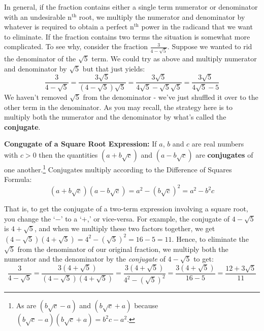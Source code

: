 \documentclass{ximera}
\begin{document}
In general, if the fraction contains either a single term numerator or denominator with an undesirable $\text{n}^{\text{th}}$ root, we multiply the numerator and denominator by whatever is required to obtain a perfect $\text{n}^{\text{th}}$ power in the radicand that we want to eliminate. If the fraction contains two terms the situation is somewhat more complicated.  To see why, consider the fraction $\frac{3}{4 - \sqrt{5}}$.  Suppose we wanted to rid the denominator of the $\sqrt{5}$ term.  We could try as above and multiply numerator and denominator by $\sqrt{5}$ but that just yields: \[ \dfrac{3}{4 - \sqrt{5}} = \dfrac{3\sqrt{5}}{(4 - \sqrt{5})\sqrt{5}} = \dfrac{3\sqrt{5}}{4\sqrt{5} - \sqrt{5}\sqrt{5}} = \dfrac{3\sqrt{5}}{4\sqrt{5} - 5}\] We haven't removed $\sqrt{5}$ from the denominator - we've just shuffled it over to the other term in the denominator.  As you may recall, the strategy here is to multiply both the numerator and the denominator by what's called the \textbf{conjugate}.  

\medskip

\colorbox{ResultColor}{\bbm

\begin{definition}\label{squarerootconj} \textbf{Congugate of a Square Root Expression:}  If $a$, $b$ and $c$ are real numbers with $c > 0$ then the quantities $(a + b \sqrt{c})$ and $(a - b\sqrt{c})$ are \textbf{conjugates} of one another.\footnote{As are $(b\sqrt{c} -a)$ and $(b\sqrt{c} + a)$ because $(b\sqrt{c} -a)(b\sqrt{c} + a) = b^2c - a^2$.}  Conjugates multiply according to the Difference of Squares Formula:  \[ (a + b \sqrt{c})(a - b\sqrt{c}) = a^2 - (b \sqrt{c})^2 = a^2 - b^2c\]
\end{definition}
\ebm}

\medskip

That is, to get the conjugate of a two-term expression involving a square root, you change the `$-$' to a `$+$,' or vice-versa.  For example, the conjugate of $4 - \sqrt{5}$ is $4 + \sqrt{5}$, and when we multiply these two factors together, we get $(4 - \sqrt{5})(4 + \sqrt{5}) = 4^2 - (\sqrt{5})^2 = 16 - 5 = 11$.  Hence, to eliminate the $\sqrt{5}$ from the denominator of our original fraction, we multiply both the numerator and the denominator by the \textit{conjugate} of $4-\sqrt{5}$ to get: \[\dfrac{3}{4 - \sqrt{5}} = \dfrac{3 (4 + \sqrt{5})}{(4 - \sqrt{5})(4 + \sqrt{5})} = \dfrac{3 (4 + \sqrt{5})}{4^2 - (\sqrt{5})^2} = \dfrac{3(4 + \sqrt{5})}{16 - 5} = \dfrac{12 + 3\sqrt{5}}{11}\] 
\end{document}
